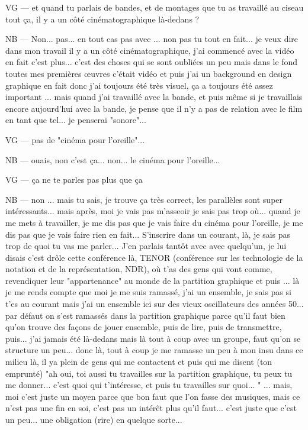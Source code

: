 VG — et quand tu parlais de bandes, et de montages que tu as travaillé au ciseau tout ça, il y a un côté cinématographique là-dedans ?

NB — Non... pas... en tout cas pas avec ... non pas tu tout en fait...  je veux dire dans mon travail il y a un côté cinématographique, j'ai commencé avec la vidéo en fait c'est plus... c'est des choses qui se sont oubliées un peu mais dans le fond toutes mes premières œuvres c'était vidéo et puis j'ai un background en design graphique en fait donc j'ai toujours été très visuel, ça a toujours été  assez important ... mais quand j'ai travaillé avec la bande, et puis même si je travaillais encore aujourd'hui avec la bande, je pense que il n'y a pas de relation avec le film en tant que tel... je penserai "sonore"...

VG — pas de "cinéma pour l'oreille"... 

NB — ouais, non c'est ça... non... le cinéma pour l'oreille... 

VG — ça ne te parles pas plus que ça 

NB — non ... mais tu sais, je trouve ça très correct, les parallèles sont super intéressants... mais après, moi je vais pas m'asseoir je sais pas trop où... quand je me mets à travailler, je me dis pas que je vais faire du cinéma pour l'oreille, je me dis pas que je vais faire rien en fait... S'inscrire dans un courant, là, je sais pas trop de quoi tu vas me parler...  J'en parlais tantôt avec avec quelqu'un, je lui disais c'est drôle cette conférence là, TENOR (conférence sur les technologie de la notation et de la représentation, NDR), où t'as des gens qui vont comme, revendiquer leur "appartenance" au monde de la partition graphique et puis ... là je me rends compte que moi je me suis ramassé, j'ai un ensemble, je sais pas si t'es au courant mais j'ai un ensemble ici sur des vieux oscillateurs des années 50... par défaut on s'est ramassés dans la partition graphique parce qu'il faut bien qu'on trouve des façons de jouer ensemble, puis de lire, puis de transmettre, puis... j'ai jamais été là-dedans mais là tout à coup avec un groupe, faut qu'on se structure un peu... donc là, tout à coup je me ramasse un peu à mon insu dans ce milieu là, il ya plein de gens qui me contactent et puis qui me disent (ton emprunté) "ah oui, toi aussi tu travailles sur la partition graphique, tu peux tu me donner... c'est quoi qui t'intéresse, et puis tu travailles sur quoi... " ... mais, moi c'est juste un moyen parce que bon faut que l'on fasse des musiques, mais ce n'est pas une fin en soi, c'est pas un intérêt plus qu'il faut... c'est juste que c'est un peu... une obligation (rire) en quelque sorte...

